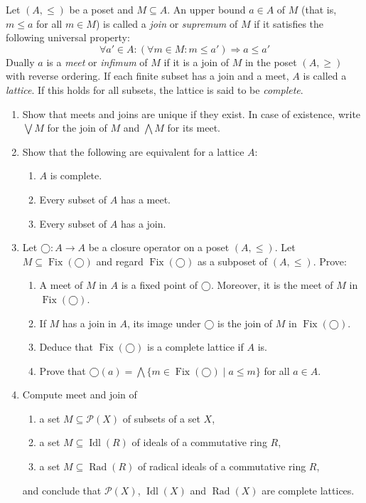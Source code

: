 \documentclass{exercises}
\DeclareMathOperator{\Idl}{Idl}
\DeclareMathOperator{\Rad}{Rad}
\DeclareMathOperator{\Fix}{Fix}
\begin{document}
\begin{exercise}
  Let $(A,≤)$ be a poset and $M⊆A$.
  An upper bound $a ∈ A$ of $M$ (that is, $m ≤ a$ for all $m ∈ M$) is called a \emph{join} or \emph{supremum} of $M$ if it satisfies the following universal property:
  $$
  ∀a' ∈ A: (∀m ∈ M:m ≤ a') ⇒ a ≤ a'
  $$
  Dually $a$ is a \emph{meet} or \emph{infimum} of $M$ if it is a join of $M$ in the poset $(A,≥)$ with reverse ordering.
  If each finite subset has a join and a meet, $A$ is called a \emph{lattice}.
  If this holds for all subsets, the lattice is said to be \emph{complete}.

  \begin{enumerate}
    \item Show that meets and joins are unique if they exist.  In case of existence, write $⋁ M$ for the join of $M$ and $⋀ M$ for its meet.
    \item Show that the following are equivalent for a lattice $A$:
      \begin{enumerate}
        \item $A$ is complete.
        \item Every subset of $A$ has a meet.
        \item Every subset of $A$ has a join.
      \end{enumerate}
    \item Let $◯:A → A$ be a closure operator on a poset $(A,≤)$.
    Let $M⊆\Fix(◯)$ and regard $\Fix(◯)$ as a subposet of $(A,≤)$.
      Prove:
      \begin{enumerate}
        \item A meet of $M$ in $A$ is a fixed point of $◯$.
          Moreover, it is the meet of $M$ in $\Fix(◯)$.
        \item If $M$ has a join in $A$, its image under $◯$ is the join of $M$ in $\Fix(◯)$.
        \item Deduce that $\Fix(◯)$ is a complete lattice if $A$ is.
        \item Prove that $◯(a) = ⋀ \{m ∈ \Fix(◯) \mid a ≤ m\}$ for all $a ∈ A$.
      \end{enumerate}
    \item Compute meet and join of
      \begin{enumerate}
        \item a set $M⊆𝒫(X)$ of subsets of a set $X$,
        \item a set $M⊆\Idl(R)$ of ideals of a commutative ring $R$,
        \item a set $M⊆\Rad(R)$ of radical ideals of a commutative ring $R$,
      \end{enumerate}
      and conclude that $𝒫(X)$, $\Idl(X)$ and $\Rad(X)$ are complete lattices.
  \end{enumerate}
\end{exercise}
\end{document}
